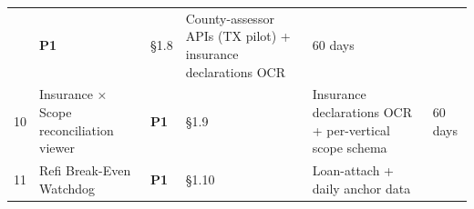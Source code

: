 \documentclass[
  10pt,
]{article}
\begin{document}
\begin{longtable}[]{@{}llllll@{}}
\begin{minipage}[t]{0.14\columnwidth}
\end{minipage} & \begin{minipage}[t]{0.14\columnwidth}\raggedright
\textbf{P1}\strut
\end{minipage} & \begin{minipage}[t]{0.14\columnwidth}\raggedright
§1.8\strut
\end{minipage} & \begin{minipage}[t]{0.14\columnwidth}\raggedright
County-assessor APIs (TX pilot) + insurance declarations OCR\strut
\end{minipage} & \begin{minipage}[t]{0.14\columnwidth}\raggedright
60 days\strut
\end{minipage}\tabularnewline
\begin{minipage}[t]{0.14\columnwidth}\raggedright
10\strut
\end{minipage} & \begin{minipage}[t]{0.14\columnwidth}\raggedright
Insurance × Scope reconciliation viewer\strut
\end{minipage} & \begin{minipage}[t]{0.14\columnwidth}\raggedright
\textbf{P1}\strut
\end{minipage} & \begin{minipage}[t]{0.14\columnwidth}\raggedright
§1.9\strut
\end{minipage} & \begin{minipage}[t]{0.14\columnwidth}\raggedright
Insurance declarations OCR + per-vertical scope schema\strut
\end{minipage} & \begin{minipage}[t]{0.14\columnwidth}\raggedright
60 days\strut
\end{minipage}\tabularnewline
\begin{minipage}[t]{0.14\columnwidth}\raggedright
11\strut
\end{minipage} & \begin{minipage}[t]{0.14\columnwidth}\raggedright
Refi Break-Even Watchdog\strut
\end{minipage} & \begin{minipage}[t]{0.14\columnwidth}\raggedright
\textbf{P1}\strut
\end{minipage} & \begin{minipage}[t]{0.14\columnwidth}\raggedright
§1.10\strut
\end{minipage} & \begin{minipage}[t]{0.14\columnwidth}\raggedright
Loan-attach + daily anchor data\strut

\end{minipage}
\end{longtable}
\end{document}
